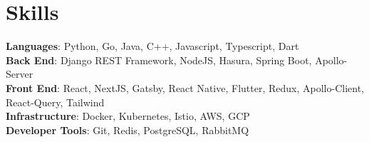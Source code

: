 \documentclass[letterpaper,11pt]{article}
\begin{document}
\section{Skills}
 \begin{itemize}[leftmargin=0in, label={}]
    \small{\item{
     \textbf{Languages}{: Python, Go, Java, C++, Javascript, Typescript, Dart} \\
     \textbf{Back End}{: Django REST Framework, NodeJS, Hasura, Spring Boot, Apollo-Server} \\
     \textbf{Front End}{: React, NextJS, Gatsby, React Native, Flutter, Redux, Apollo-Client, React-Query, Tailwind} \\
     \textbf{Infrastructure}{: Docker, Kubernetes, Istio, AWS, GCP} \\
     \textbf{Developer Tools}{: Git, Redis, PostgreSQL, RabbitMQ} \\
    }}
 \end{itemize}


\end{document}
